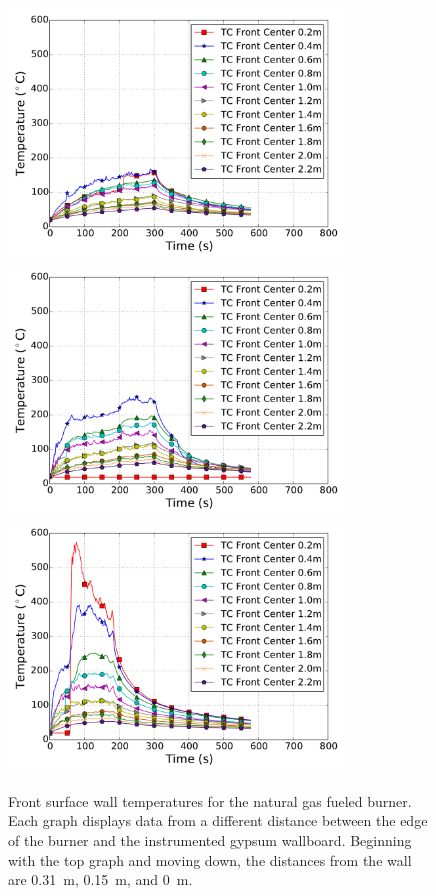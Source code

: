 \documentclass[twoside]{uocthesis}
\begin{document}
\begin{figure}[p]
	\centering
	\includegraphics[width=3.5in]{../Figures/IWGBNG01_TC_Surface_Center_Avg}\\
	\includegraphics[width=3.5in]{../Figures/IWGBNG04_TC_Surface_Center_Avg}\\
	\includegraphics[width=3.5in]{../Figures/IWGBNG05_TC_Surface_Center_Avg}\\
	\caption[Front surface wall temperatures for the natural gas fueled burner]{Front surface wall temperatures for the natural gas fueled burner. Each graph displays data from a different distance between the edge of the burner and the instrumented gypsum wallboard.  Beginning with the top graph and moving down, the distances from the wall are 0.31~m, 0.15~m, and 0~m.}
	\label{IWGB_NG_TC_Wall_set}
\end{figure}
\end{document}

